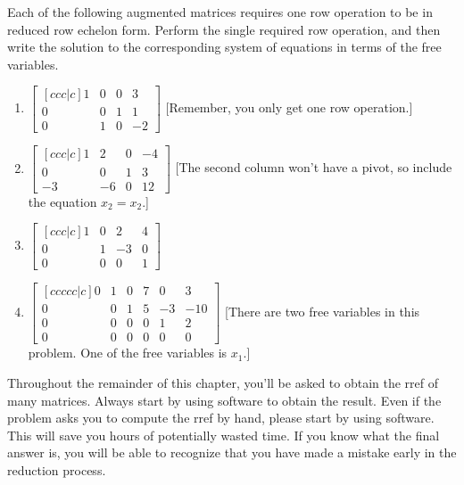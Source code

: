 \begin{problem}
%
Each of the following augmented matrices requires one row operation to be in reduced row echelon form. Perform the single required row operation, and then write the solution to the corresponding system of equations in terms of the free variables.
\begin{multicols}{2}
\begin{enumerate}
	\item 
$
\begin{bmatrix}[ccc|c]
 1 & 0 & 0 & 3 \\
 0 & 0 & 1 & 1 \\
 0 & 1 & 0 & -2
\end{bmatrix}
$ [Remember, you only get one row operation.]
	\item 
$
\begin{bmatrix}[ccc|c]
 1 & 2 & 0 & -4 \\
 0 & 0 & 1 & 3 \\
 -3 & -6 & 0 & 12
\end{bmatrix}
$ [The second column won't have a pivot, so include the equation $x_2=x_2$.]
	\item 
$
\begin{bmatrix}[ccc|c]
 1 & 0 & 2 & 4 \\
 0 & 1 & -3 & 0 \\
 0 & 0 & 0 & 1
\end{bmatrix}
$
	\item 
$
\begin{bmatrix}[ccccc|c]
 0 & 1 & 0 & 7 & 0 & 3 \\
 0 & 0 & 1 & 5 & -3 & -10 \\
 0 & 0 & 0 & 0 & 1 & 2 \\
 0 & 0 & 0 & 0 & 0 & 0
\end{bmatrix}
$ [There are two free variables in this problem.  One of the free variables is $x_1$.]
\end{enumerate}
\end{multicols}
\end{problem}



Throughout the remainder of this chapter, you'll be asked to obtain the rref of many matrices. Always start by using software to obtain the result. 
Even if the problem asks you to compute the rref by hand, please start by using software. This will save you hours of potentially wasted time. 
If you know what the final answer is, you will be able to recognize that you have made a mistake early in the reduction process.

